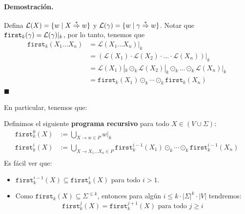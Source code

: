 \paragraph{Demostración.} Defina $\mathcal{L}(X)=\{w \mid X \overset{*}{\Rightarrow} w\}$ y $\mathcal{L}(\gamma) = \{w \mid \gamma \overset{*}{\Rightarrow} w\}$. Notar que $\texttt{first}_k(\gamma) = \mathcal{L}(\gamma)|_k$, por lo tanto, tenemos que
\begin{align*}
    \texttt{first}_k\left(X_1 \ldots X_n\right) & =\left.\mathcal{L}\left(X_1 \ldots X_n\right)\right|_k                                                                                    \\
                                                & =\left.\left(\mathcal{L}\left(X_1\right) \cdot \mathcal{L}\left(X_2\right) \cdot \ldots \cdot \mathcal{L}\left(X_n\right)\right)\right|_k \\
                                                & =\mathcal{L}\left(X_1\right)|_k \odot_k \mathcal{L}\left(X_2\right)|_k \odot_k \ldots \odot_k \mathcal{L}\left(X_n\right)|_k                \\
                                                & =\texttt{first}_k\left(X_1\right) \odot_k \cdots \odot_k \texttt{first}_k\left(X_n\right)
\end{align*}
\hfill $\blacksquare$ \medbreak

En particular, tenemos que:

Definimos el siguiente \textbf{programa recursivo} para todo $X \in (V \cup \Sigma)$:
\begin{align*}
    \texttt{first}_k^0(X) & :=\bigcup_{X \rightarrow w \in P} w|_k                                                                                                              \\
    \texttt{first}_k^i(X) & :=\bigcup_{X \rightarrow X_1 \ldots X_n \in P} \texttt{first}_k^{i-1}\left(X_1\right) \odot_k \cdots \odot_k \texttt{first}_k^{i-1}\left(X_n\right) \\
\end{align*}
Es fácil ver que:
\begin{itemize}
    \item $\texttt{first}_k^{i-1}(X) \subseteq \texttt{first}_k^i(X)$ para todo $i > 1$.
    \item Como $\texttt{first}_k(X) \subseteq \Sigma^{\le k}$, entonces para algún $i \le k \cdot |\Sigma|^k \cdot |V|$ tendremos:
          $$
              \texttt{first}_k^j(X)=\texttt{first}_k^{j+1}(X) \text { para todo } j \geq i
          $$
\end{itemize}

